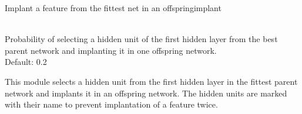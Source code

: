 \begin{moduledoc}{Implant a feature from the fittest  net in an offspring}{implant}

\item[\KeyWord{implantProb} \optParam{ x } ]~\\
    Probability of selecting a hidden unit of the first hidden layer
	from the best parent network
	and  implanting it in one offspring network.\\
    Default: 0.2 
\end{moduledoc}


This module selects a hidden unit from the first hidden layer
in the fittest parent network
and implants it in an offspring network. The hidden units are
marked with their name to prevent implantation of a feature
twice.


